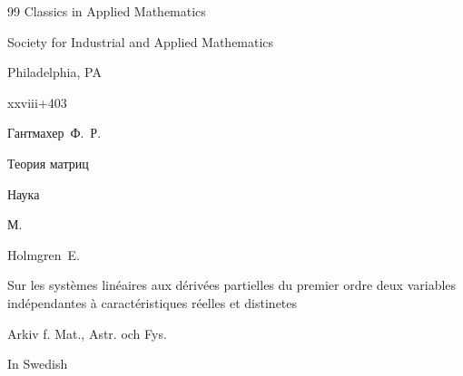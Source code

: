 \begin{thebibliography}{99}
\serial Classics in Applied Mathematics



\publ Society for Industrial and Applied Mathematics

\publaddr Philadelphia, PA

\totalpages xxviii+403








\by Гантмахер~Ф.~Р.

\book Теория матриц


\publ Наука

\publaddr М.







\by Holmgren~E.

\paper Sur les syst\`emes lin\'eaires aux d\'eriv\'ees partielles du premier ordre deux variables ind\'ependantes \`a caract\'eristiques r\'eelles et distinetes

\jour Arkiv f. Mat., Astr. och Fys.




\lang In Swedish





\end{thebibliography}







\newpage







\makeentitle



